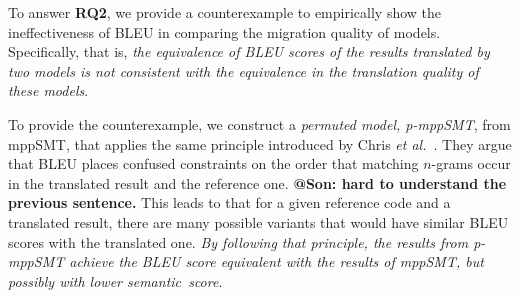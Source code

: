 To answer {\bf RQ2}, we provide a counterexample to empirically show the 
ineffectiveness of BLEU in comparing the migration quality of models. 
%
Specifically, that is, {\em the equivalence of BLEU scores of the results translated 
by two models is not consistent with the equivalence in the translation quality 
of these models}.
%

To provide the counterexample, we construct a {\em permuted model,
  p-mppSMT}, from mppSMT, that applies the same principle introduced
by Chris {\em et al.}~\cite{Callison}. They argue that BLEU places
confused constraints on the order that matching $n$-grams occur in the
translated result and the reference one. {\bf @Son: hard to understand
  the previous sentence.} This leads to that for
a given reference code and a translated result, there are many
possible variants that would have similar BLEU scores with the
translated one.  {\em By following that principle, the results from
p-mppSMT achieve the BLEU score equivalent with the results of
mppSMT, but possibly with lower semantic~score}.

%

